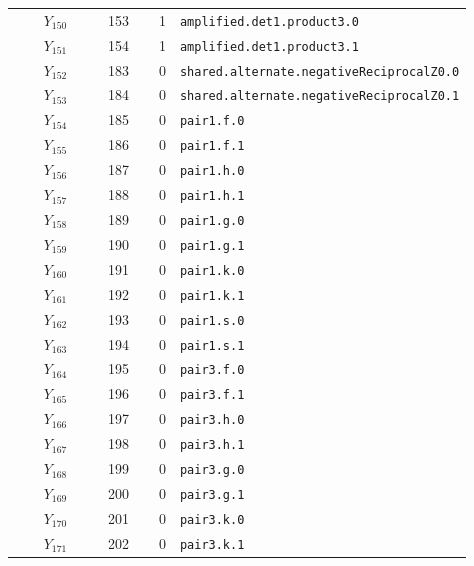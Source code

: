 {\begin{longtable}{@{}r r r p{0.64\linewidth}@{}}
\(Y_{150}\) & 153 & 1 & \texttt{amplified.\allowbreak{}det1.\allowbreak{}product3.\allowbreak{}0} \\
\(Y_{151}\) & 154 & 1 & \texttt{amplified.\allowbreak{}det1.\allowbreak{}product3.\allowbreak{}1} \\
\(Y_{152}\) & 183 & 0 & \texttt{shared.\allowbreak{}alternate.\allowbreak{}negativeReciprocalZ0.\allowbreak{}0} \\
\(Y_{153}\) & 184 & 0 & \texttt{shared.\allowbreak{}alternate.\allowbreak{}negativeReciprocalZ0.\allowbreak{}1} \\
\(Y_{154}\) & 185 & 0 & \texttt{pair1.\allowbreak{}f.\allowbreak{}0} \\
\(Y_{155}\) & 186 & 0 & \texttt{pair1.\allowbreak{}f.\allowbreak{}1} \\
\(Y_{156}\) & 187 & 0 & \texttt{pair1.\allowbreak{}h.\allowbreak{}0} \\
\(Y_{157}\) & 188 & 0 & \texttt{pair1.\allowbreak{}h.\allowbreak{}1} \\
\(Y_{158}\) & 189 & 0 & \texttt{pair1.\allowbreak{}g.\allowbreak{}0} \\
\(Y_{159}\) & 190 & 0 & \texttt{pair1.\allowbreak{}g.\allowbreak{}1} \\
\(Y_{160}\) & 191 & 0 & \texttt{pair1.\allowbreak{}k.\allowbreak{}0} \\
\(Y_{161}\) & 192 & 0 & \texttt{pair1.\allowbreak{}k.\allowbreak{}1} \\
\(Y_{162}\) & 193 & 0 & \texttt{pair1.\allowbreak{}s.\allowbreak{}0} \\
\(Y_{163}\) & 194 & 0 & \texttt{pair1.\allowbreak{}s.\allowbreak{}1} \\
\(Y_{164}\) & 195 & 0 & \texttt{pair3.\allowbreak{}f.\allowbreak{}0} \\
\(Y_{165}\) & 196 & 0 & \texttt{pair3.\allowbreak{}f.\allowbreak{}1} \\
\(Y_{166}\) & 197 & 0 & \texttt{pair3.\allowbreak{}h.\allowbreak{}0} \\
\(Y_{167}\) & 198 & 0 & \texttt{pair3.\allowbreak{}h.\allowbreak{}1} \\
\(Y_{168}\) & 199 & 0 & \texttt{pair3.\allowbreak{}g.\allowbreak{}0} \\
\(Y_{169}\) & 200 & 0 & \texttt{pair3.\allowbreak{}g.\allowbreak{}1} \\
\(Y_{170}\) & 201 & 0 & \texttt{pair3.\allowbreak{}k.\allowbreak{}0} \\
\(Y_{171}\) & 202 & 0 & \texttt{pair3.\allowbreak{}k.\allowbreak{}1} \\

\end{longtable}}
